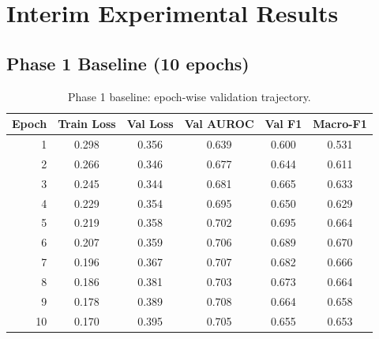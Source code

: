 \documentclass[11pt]{article}
\begin{document}
\section{Interim Experimental Results}
\subsection{Phase 1 Baseline (10 epochs)}
\begin{table}[t]
\centering
\small
\caption{Phase 1 baseline: epoch-wise validation trajectory.}
\begin{tabular}{rccccc}
\toprule
Epoch & Train Loss & Val Loss & Val AUROC & Val F1 & Macro-F1 \\
\midrule
1 & 0.298 & 0.356 & 0.639 & 0.600 & 0.531 \\
2 & 0.266 & 0.346 & 0.677 & 0.644 & 0.611 \\
3 & 0.245 & 0.344 & 0.681 & 0.665 & 0.633 \\
4 & 0.229 & 0.354 & 0.695 & 0.650 & 0.629 \\
5 & 0.219 & 0.358 & 0.702 & 0.695 & 0.664 \\
6 & 0.207 & 0.359 & 0.706 & 0.689 & 0.670 \\
7 & 0.196 & 0.367 & 0.707 & 0.682 & 0.666 \\
8 & 0.186 & 0.381 & 0.703 & 0.673 & 0.664 \\
9 & 0.178 & 0.389 & 0.708 & 0.664 & 0.658 \\
10 & 0.170 & 0.395 & 0.705 & 0.655 & 0.653 \\
\bottomrule
\end{tabular}
\label{tab:phase1epochs}
\end{table}
\end{document}

